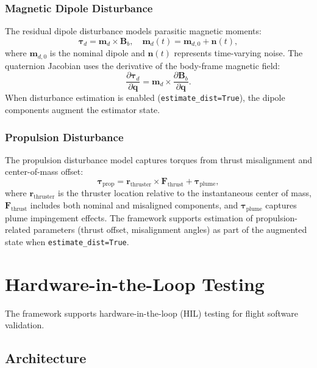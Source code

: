 \documentclass[conference]{IEEEtran}
\begin{document}
\subsubsection{Magnetic Dipole Disturbance}
The residual dipole disturbance models parasitic magnetic moments:
\begin{equation}
\boldsymbol{\tau}_d = \mathbf{m}_d \times \mathbf{B}_b, \quad \mathbf{m}_d(t) = \mathbf{m}_{d,0} + \mathbf{n}(t),
\end{equation}
where $\mathbf{m}_{d,0}$ is the nominal dipole and $\mathbf{n}(t)$ represents time-varying noise. The quaternion Jacobian uses the derivative of the body-frame magnetic field:
\begin{equation}
\frac{\partial \boldsymbol{\tau}_d}{\partial \mathbf{q}} = \mathbf{m}_d \times \frac{\partial \mathbf{B}_b}{\partial \mathbf{q}}.
\end{equation}
When disturbance estimation is enabled (\texttt{estimate\_dist=True}), the dipole components augment the estimator state.

\subsubsection{Propulsion Disturbance}
The propulsion disturbance model captures torques from thrust misalignment and center-of-mass offset:
\begin{equation}
\boldsymbol{\tau}_{\text{prop}} = \mathbf{r}_{\text{thruster}} \times \mathbf{F}_{\text{thrust}} + \boldsymbol{\tau}_{\text{plume}},
\end{equation}
where $\mathbf{r}_{\text{thruster}}$ is the thruster location relative to the instantaneous center of mass, $\mathbf{F}_{\text{thrust}}$ includes both nominal and misaligned components, and $\boldsymbol{\tau}_{\text{plume}}$ captures plume impingement effects. The framework supports estimation of propulsion-related parameters (thrust offset, misalignment angles) as part of the augmented state when \texttt{estimate\_dist=True}.


\section{Hardware-in-the-Loop Testing}\label{sec:hil}

The framework supports hardware-in-the-loop (HIL) testing for flight software validation.

\subsection{Architecture}\label{subsec:hil_arch}
\end{document}
